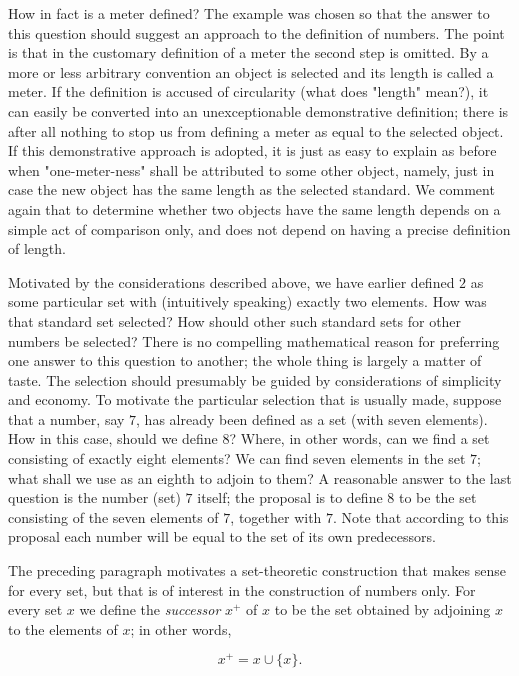 How in fact is a meter defined? The example was chosen so that the answer to this question should suggest an approach to the definition of numbers. The point is that in the customary definition of a meter the second step is omitted. By a more or less arbitrary convention an object is selected and its length is called a meter. If the definition is accused of circularity (what does "length" mean?), it can easily be converted into an unexceptionable demonstrative definition; there is after all nothing to stop us from defining a meter as equal to the selected object. If this demonstrative approach is adopted, it is just as easy to explain as before when "one-meter-ness" shall be attributed to some other object, namely, just in case the new object has the same length as the selected standard. We comment again that to determine whether two objects have the same length depends on a simple act of comparison only, and does not depend on having a precise definition of length. 

Motivated by the considerations described above, we have earlier defined $2$ as some particular set with (intuitively speaking) exactly two elements. How was that standard set selected? How should other such standard sets for other numbers be selected? There is no compelling mathematical reason for preferring one answer to this question to another; the whole thing is largely a matter of taste. The selection should presumably be guided by considerations of simplicity and economy. To motivate the particular selection that is usually made, suppose that a number, say $7$, has already been defined as a set (with seven elements). How in this case, should we define $8$? Where, in other words, can we find a set consisting of exactly eight elements? We can find seven elements in the set $7$; what shall we use as an eighth to adjoin to them? A reasonable answer to the last question is the number (set) $7$ itself; the proposal is to define $8$ to be the set consisting of the seven elements of $7$, together with $7$. Note that according to this proposal each number will be equal to the set of its own predecessors. 

The preceding paragraph motivates a set-theoretic construction that makes sense for every set, but that is of interest in the construction of numbers only. For every set $x$ we define the \textit{successor} $x^{+}$ of $x$ to be the set obtained by adjoining $x$ to the elements of $x$; in other words,

\begin{equation*}
x^{+} = x \cup \{ x \}.
\end{equation*}

